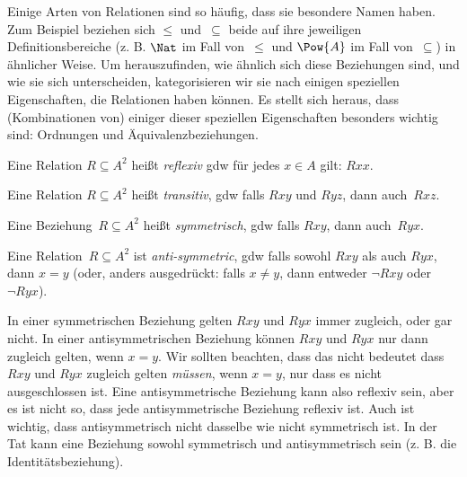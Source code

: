 \documentclass[../../../include/open-logic-section]{subfiles}
\begin{document}

\begin{intro}
Einige Arten von Relationen sind so häufig, dass sie besondere Namen haben.
Zum Beispiel beziehen sich $\le$ und~$\subseteq$ beide auf
ihre jeweiligen Definitionsbereiche (z. B. $\Nat$ im Fall von~$\le$ und
$\Pow{A}$ im Fall von~$\subseteq$) in ähnlicher Weise.  Um herauszufinden,
wie ähnlich sich diese Beziehungen sind, und wie sie sich unterscheiden,
kategorisieren wir sie nach einigen speziellen Eigenschaften, die Relationen
haben können.  Es stellt sich heraus, dass (Kombinationen von) einiger dieser speziellen
Eigenschaften besonders wichtig sind: Ordnungen und Äquivalenzbeziehungen.
\end{intro}

\begin{defn}[Reflexivität]
Eine Relation $R \subseteq A^2$ heißt \emph{reflexiv} gdw für jedes $x \in
A$ gilt: $Rxx$.
\end{defn}

\begin{defn}[Transitivität]
Eine Relation $R \subseteq A^2$ heißt \emph{transitiv}, gdw falls $Rxy$
und $Ryz$, dann auch~$Rxz$.
\end{defn}

\begin{defn}[Symmetrie]
Eine Beziehung~$R \subseteq A^2$ heißt \emph{symmetrisch}, gdw falls
$Rxy$, dann auch~$Ryx$.
\end{defn}

\begin{defn}[Antisymmetrie]
Eine Relation~$R \subseteq A^2$ ist \emph{anti-sym\-met\-ric}, gdw falls sowohl
$Rxy$ als auch $Ryx$, dann $x=y$ (oder, anders ausgedrückt: falls $x\neq y$, dann
entweder $\lnot Rxy$ oder $\lnot Ryx$).
\end{defn}

\begin{explain}
In einer symmetrischen Beziehung gelten $Rxy$ und $Ryx$ immer zugleich, oder
gar nicht.  In einer antisymmetrischen Beziehung können $Rxy$
und $Ryx$ nur dann zugleich gelten, wenn $x = y$.  Wir sollten beachten, dass das nicht bedeutet
dass $Rxy$ und $Ryx$ zugleich gelten \emph{müssen}, wenn $x = y$, nur dass es
nicht ausgeschlossen ist.  Eine antisymmetrische Beziehung kann also reflexiv sein, aber
es ist nicht so, dass jede antisymmetrische Beziehung reflexiv ist.
Auch ist wichtig, dass \glqq antisymmetrisch\grqq{} nicht dasselbe wie
\glqq nicht symmetrisch\grqq{} ist.  In der Tat kann eine Beziehung sowohl
symmetrisch und antisymmetrisch sein (z. B. die Identitätsbeziehung).
\end{explain}
\end{document}
